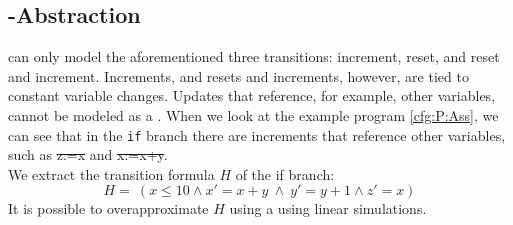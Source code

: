 \subsection{\qvasr-Abstraction}
\qvasr can only model the aforementioned three transitions: increment, reset, and reset and increment. Increments, and resets and increments, however, are tied to constant variable changes. Updates that reference, for example, other variables, cannot be modeled as a \qvasr. When we look at the example program \ref{cfg:P:Ass}, we can see that in the \texttt{if} branch there are increments that reference other variables, such as \st{z:=x} and \st{x:=x+y}. \\
We extract the transition formula $H$ of the if branch:
\begin{equation*}
	H= \ (x \leq 10 \land x' = x + y\ \land\ y' = y + 1 \land z' = x)
\end{equation*}
It is possible to overapproximate $H$ using a \qvasr using linear simulations.

